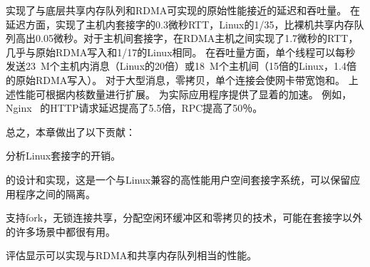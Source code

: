 
\sys {}实现了与底层共享内存队列和RDMA可实现的原始性能接近的延迟和吞吐量。
在延迟方面，\sys {}实现了主机内套接字的0.3微秒RTT，Linux的1/35，比裸机共享内存队列高出0.05微秒。对于主机间套接字，\sys {}在RDMA主机之间实现了1.7微秒的RTT，几乎与原始RDMA写入和1/17的Linux相同。
在吞吐量方面，单个线程可以每秒发送23~M个主机内消息（Linux的20倍）或18~M个主机间（15倍的Linux，1.4倍的原始RDMA写入）。
对于大型消息，零拷贝，单个连接会使网卡带宽饱和。
上述性能可根据内核数量进行扩展。
\sys {}为实际应用程序提供了显着的加速。
例如，Nginx~ \cite {nginx}的HTTP请求延迟提高了5.5倍，RPC提高了50％。

总之，本章做出了以下贡献：
\begin{ecompact}
\item 分析Linux套接字的开销。
\item \sys {}的设计和实现，这是一个与Linux兼容的高性能用户空间套接字系统，可以保留应用程序之间的隔离。
\item 支持fork，无锁连接共享，分配空闲环缓冲区和零拷贝的技术，可能在套接字以外的许多场景中都很有用。
\item 评估显示\sys {}可以实现与RDMA和共享内存队列相当的性能。
\end{ecompact}


